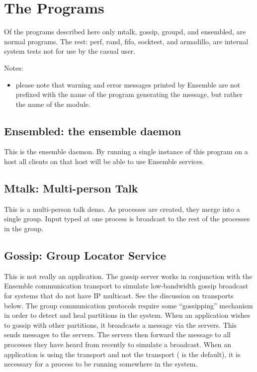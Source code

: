 %
%
%
\section{The Programs}
Of the programs described here only mtalk, gossip, groupd, and
ensembled, are normal programs. The rest: perf, rand, fifo, socktest,
and armadillo, are internal system tests not for use by the casual user. 

Notes:
\begin{itemize}
\item
please note that warning and error messages printed by Ensemble are
not prefixed with the name of the program generating the message, but
rather the name of the module.
\end{itemize}

\subsection{Ensembled: the ensemble daemon}
This is the ensemble daemon. By running a single instance of this
program on a host all clients on that host will be able to use Ensemble services. 

\subsection{Mtalk: Multi-person Talk}
This is a multi-person talk demo.  As  processes are created, they merge
into a single group.  Input typed at one process is broadcast to the rest of the
processes in the group.

\subsection{Gossip: Group Locator Service}
This is not really an application.  The gossip server works in
conjunction with the Ensemble  communication transport to
simulate low-bandwidth gossip broadcast for systems that do not have
IP multicast.  See the discussion on transports below.  The group
communication protocols require some ``gossipping'' mechanism in order
to detect and heal partitions in the system.  When an application
wishes to gossip with other partitions, it broadcasts a message via
the  servers.  This sends messages to the 
servers.  The  servers then forward the message to all
processes they have heard from recently to simulate a broadcast.  When
an application is using the  transport and not the
 transport ( is the default), it is
necessary for a  process to be running somewhere in the
system.

